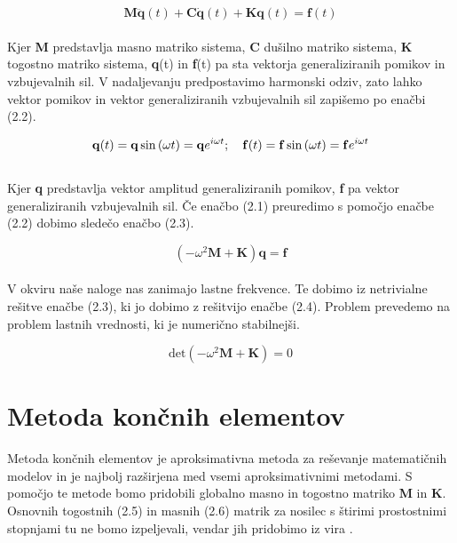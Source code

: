 \documentclass[12pt]{report}
\begin{document}
\begin{equation}
  \mathbf{M} \mathbf{\ddot{q}}(t) + \mathbf{C} \mathbf{\dot{q}}(t) + \mathbf{K} \mathbf{q}(t) = \mathbf{f}(t)
\end{equation}
\\
Kjer \textbf{M} predstavlja masno matriko sistema, \textbf{C} dušilno matriko sistema, \textbf{K} togostno matriko sistema, \textbf{q}(t) in \textbf{f}(t)
pa sta vektorja generaliziranih pomikov in vzbujevalnih sil.
V nadaljevanju predpostavimo harmonski odziv, zato lahko vektor pomikov in vektor generaliziranih vzbujevalnih sil zapišemo po enačbi (2.2).

\begin{equation}
  \mathbf{q}(t)=\mathbf{q} \sin{(\omega t)} =\mathbf{q}e^{i\omega t}; \\ \quad
  \mathbf{f}(t)=\mathbf{f} \sin{(\omega t)} =\mathbf{f}e^{i\omega t}
\end{equation}
\\
Kjer \textbf{q} predstavlja vektor amplitud generaliziranih pomikov, \textbf{f} pa vektor generaliziranih vzbujevalnih sil. Če enačbo (2.1) preuredimo s pomočjo enačbe (2.2) dobimo sledečo enačbo
(2.3).

\begin{equation}
  (-\omega^2 \mathbf{M} + \mathbf{K}) \mathbf{q} = \mathbf{f}
\end{equation}
\\
V okviru naše naloge nas zanimajo lastne frekvence. Te dobimo iz netrivialne rešitve enačbe (2.3), ki jo dobimo z rešitvijo enačbe (2.4).
Problem prevedemo na problem lastnih vrednosti, ki je numerično stabilnejši.

\begin{equation}
  \textrm{det} (-\omega^2 \mathbf{M} + \mathbf{K})=0  
\end{equation}

\section{Metoda končnih elementov}
Metoda končnih elementov je aproksimativna metoda za reševanje matematičnih modelov in je najbolj razširjena med vsemi aproksimativnimi metodami.
S pomočjo te metode bomo pridobili globalno masno in togostno matriko \textbf{M} in \textbf{K}. 
\\
Osnovnih togostnih (2.5) in masnih (2.6) matrik za nosilec s štirimi prostostnimi stopnjami tu ne bomo izpeljevali, vendar jih pridobimo iz vira \cite{ville}.
\end{document}
